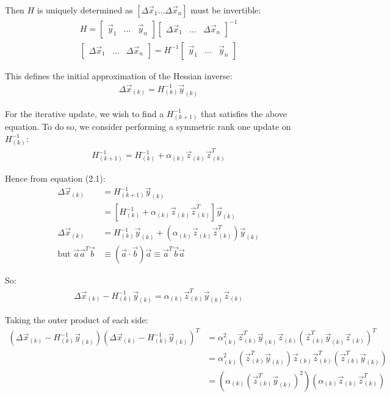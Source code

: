 \documentclass[paper=a4, fontsize=12pt]{scrartcl} %
\numberwithin{equation}{section} %
\numberwithin{figure}{section} %
\numberwithin{table}{section} %
\begin{document}
Then $H$ is uniquely determined as $\left[ \Delta \vec{x}_1 \ldots \Delta \vec{x}_n \right]$ must be invertible:
\begin{align*}
    H = \begin{bmatrix}
        \vec{y}_1 & \ldots & \vec{y}_n
    \end{bmatrix} \begin{bmatrix}
        \Delta \vec{x}_1 & \ldots & \Delta \vec{x}_n
    \end{bmatrix}^{-1} \\
    \begin{bmatrix}
        \Delta \vec{x}_1 & \ldots & \Delta \vec{x}_n
    \end{bmatrix} = H^{-1} \begin{bmatrix}
        \vec{y}_1 & \ldots & \vec{y}_n
    \end{bmatrix}
\end{align*}

This defines the initial approximation of the Hessian inverse:
\begin{align}
    \Delta \vec{x}_{(k)} = H_{(k)}^{-1} \vec{y}_{(k)}
\end{align}

For the iterative update, we wish to find a $H_{(k+1)}^{-1}$ that satisfies the above equation. To do so, we consider performing a symmetric rank one update on $H_{(k)}^{-1}$:
\begin{align}
    H_{(k+1)}^{-1} = H_{(k)}^{-1} + \alpha_{(k)} \vec{z}_{(k)} \vec{z}_{(k)}^T
\end{align}

Hence from equation (2.1):
\begin{align*}
    \Delta \vec{x}_{(k)} &= H_{(k+1)}^{-1} \vec{y}_{(k)} \\
    &= \left[ H_{(k)}^{-1} + \alpha_{(k)} \vec{z}_{(k)} \vec{z}_{(k)}^T \right] \vec{y}_{(k)} \\
    \Delta \vec{x}_{(k)} &= H_{(k)}^{-1} \vec{y}_{(k)} + (\alpha_{(k)} \vec{z}_{(k)} \vec{z}_{(k)}^T) \vec{y}_{(k)} \\
    \text{but } \vec{a} \vec{a}^T \vec{b} &\equiv (\vec{a} \cdot \vec{b}) \vec{a} \equiv \vec{a}^T \vec{b} \vec{a}
\end{align*}

So:
\begin{align}
    \Delta \vec{x}_{(k)} - H_{(k)}^{-1} \vec{y}_{(k)} = \alpha_{(k)} \vec{z}_{(k)}^T \vec{y}_{(k)} \vec{z}_{(k)}
\end{align}

Taking the outer product of each side:
\begin{align*}
    \left( \Delta \vec{x}_{(k)} - H_{(k)}^{-1} \vec{y}_{(k)} \right) \left( \Delta \vec{x}_{(k)} - H_{(k)}^{-1} \vec{y}_{(k)} \right)^T &= \alpha_{(k)}^2 \vec{z}_{(k)}^T \vec{y}_{(k)} \vec{z}_{(k)} \left( \vec{z}_{(k)}^T \vec{y}_{(k)} \vec{z}_{(k)} \right)^T \\
    &= \alpha_{(k)}^2 \left( \vec{z}_{(k)}^T \vec{y}_{(k)} \right) \vec{z}_{(k)} \vec{z}_{(k)}^T \left( \vec{z}_{(k)}^T \vec{y}_{(k)} \right) \\
    &= \left( \alpha_{(k)} (\vec{z}_{(k)}^T \vec{y}_{(k)})^2 \right) \left( \alpha_{(k)} \vec{z}_{(k)} \vec{z}_{(k)}^T \right)
\end{align*}
\end{document}
